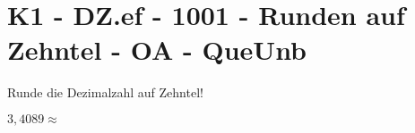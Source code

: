 \section{K1 - DZ.ef - 1001 - Runden auf Zehntel - OA - QueUnb}

\begin{beispiel}{0} %
				Runde die Dezimalzahl auf Zehntel!\leer
					
					$3,4089\approx$ 
\end{beispiel}